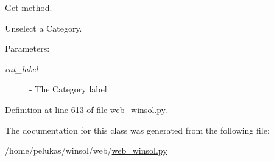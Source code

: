 Get method. 

Unselect a Category.

\begin{Desc}
\item[Parameters:]
\begin{description}
\item[{\em cat\_\-label}]- The Category label. \end{description}
\end{Desc}


Definition at line 613 of file web\_\-winsol.py.

The documentation for this class was generated from the following file:\begin{CompactItemize}
\item 
/home/pelukas/winsol/web/\hyperlink{web__winsol_8py}{web\_\-winsol.py}\end{CompactItemize}
